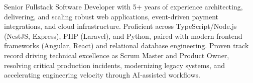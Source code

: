 

\begin{cvparagraph}
Senior Fullstack Software Developer with 5+ years of experience architecting, delivering, and scaling robust web applications, event-driven payment integrations, and cloud infrastructure. Proficient across TypeScript/Node.js (NestJS, Express), PHP (Laravel), and Python, paired with modern frontend frameworks (Angular, React) and relational database engineering. Proven track record driving technical excellence as Scrum Master and Product Owner, resolving critical production incidents, modernizing legacy systems, and accelerating engineering velocity through AI-assisted workflows.
\end{cvparagraph}

